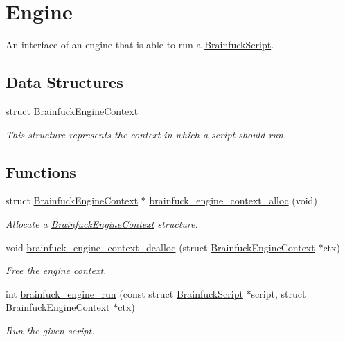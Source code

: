 \hypertarget{group__engine}{}\section{Engine}
\label{group__engine}


An interface of an engine that is able to run a \hyperlink{structBrainfuckScript}{Brainfuck\+Script}.  


\subsection*{Data Structures}
\begin{DoxyCompactItemize}
\item 
struct \hyperlink{structBrainfuckEngineContext}{Brainfuck\+Engine\+Context}
\begin{DoxyCompactList}\small\item\em This structure represents the context in which a script should run. \end{DoxyCompactList}\end{DoxyCompactItemize}
\subsection*{Functions}
\begin{DoxyCompactItemize}
\item 
struct \hyperlink{structBrainfuckEngineContext}{Brainfuck\+Engine\+Context} $\ast$ \hyperlink{group__engine_ga87ed292811cb43ff8c0b76aa7d245547}{brainfuck\+\_\+engine\+\_\+context\+\_\+alloc} (void)
\begin{DoxyCompactList}\small\item\em Allocate a \hyperlink{structBrainfuckEngineContext}{Brainfuck\+Engine\+Context} structure. \end{DoxyCompactList}\item 
void \hyperlink{group__engine_gacf18fa3a3ca4bb658af020d3830536d9}{brainfuck\+\_\+engine\+\_\+context\+\_\+dealloc} (struct \hyperlink{structBrainfuckEngineContext}{Brainfuck\+Engine\+Context} $\ast$ctx)
\begin{DoxyCompactList}\small\item\em Free the engine context. \end{DoxyCompactList}\item 
int \hyperlink{group__engine_ga3f091c103cba588d968c6b0312a4b20a}{brainfuck\+\_\+engine\+\_\+run} (const struct \hyperlink{structBrainfuckScript}{Brainfuck\+Script} $\ast$script, struct \hyperlink{structBrainfuckEngineContext}{Brainfuck\+Engine\+Context} $\ast$ctx)
\begin{DoxyCompactList}\small\item\em Run the given script. \end{DoxyCompactList}\end{DoxyCompactItemize}


